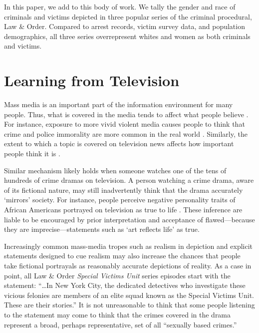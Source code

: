 \documentclass[12pt, letterpaper]{article}
\begin{document}


In this paper, we add to this body of work. We tally the gender and race of criminals and victims depicted in three popular series of the criminal procedural, Law \& Order. Compared to arrest records, victim survey data, and population demographics, all three series overrepresent whites and women as both criminals and victims. 

\section*{Learning from Television}
Mass media is an important part of the information environment for many people. Thus, what is covered in the media tends to affect what people believe \citep{gerbner1986living, shanahan1999television}. For instance, exposure to more vivid violent media causes people to think that crime and police immorality are more common in the real world \citep{riddle2010always}. Similarly, the extent to which a topic is covered on television news affects how important people think it is \citep{mccombs1972agenda, iyengar2010news, iyengar1990accessibility}. 

Similar mechanism likely holds when someone watches one of the tens of hundreds of crime dramas on television. A person watching a crime drama, aware of its fictional nature, may still inadvertently think that the drama accurately `mirrors' society. For instance, people perceive negative personality traits of African Americans portrayed on television as true to life \citep{punyanunt2008perceived}. These inference are liable to be encouraged by prior interpretation and acceptance of flawed---because they are imprecise---statements such as `art reflects life' as true. 

Increasingly common mass-media tropes such as realism in depiction and explicit statements designed to cue realism may also increase the chances that people take fictional portrayals as reasonably accurate depictions of reality. As a case in point, all Law \& Order \textit{Special Victims Unit} series episodes start with the statement: ``\ldots In New York City, the dedicated detectives who investigate these vicious felonies are members of an elite squad known as the Special Victims Unit. These are their stories.'' It is not unreasonable to think that some people listening to the statement may come to think that the crimes covered in the drama represent a broad, perhaps representative, set of all ``sexually based crimes.''
\end{document}
